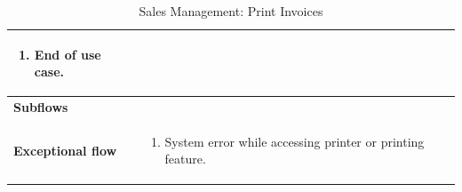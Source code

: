 \documentclass[../thesis.tex]{subfiles}
\begin{document}
\begin{center}
\begin{table}[H]
{\begin{tabular}[htbp]{|p{}|p{}|}
\begin{enumerate}
                                                       \item End of use case.
                                                   \end{enumerate} \\ \hline
                \textbf{Subflows              }  &                                                                                   \\ \hline
                \textbf{Exceptional flow       } & \begin{enumerate}
                                                       \item System error while accessing printer or printing feature.
                                                   \end{enumerate}      \\ \hline
            \end{tabular}%
        }
        \caption{Sales Management: Print Invoices}
        \label{tab:table-usecase-print-invoices}
    \end{table}
\end{center}
\end{document}
